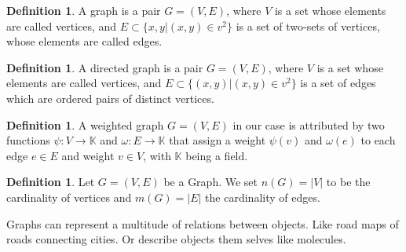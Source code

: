 \documentclass{article}
\theoremstyle{definition}
\newtheorem{definition}[theorem]{Definition}
\begin{document}
\begin{definition}
A graph is a pair $G = (V, E)$, where $V$ is a set whose elements are called vertices, and $E \subset \{ {x, y}|(x,y) \in v^{2} \}$ is a set of two-sets of vertices, whose elements are called edges.
\end{definition}

\begin{definition}
A directed graph is a pair $G = (V, E)$, where $V$ is a set whose elements are called vertices, and $E \subset \{ (x, y)|(x,y) \in v^{2} \}$ is a set of edges which are ordered pairs of distinct vertices.
\end{definition}

\begin{definition}
A weighted graph $G = (V, E)$ in our case is attributed by two functions $\psi : V \to \mathbb{K}$ and $\omega : E \to \mathbb{K}$ that assign a weight $\psi(v)$ and $\omega(e)$ to each edge $e \in E$ and weight $v \in V$, with $\mathbb{K}$ being a field.
\end{definition}

\begin{definition}
Let $G = (V, E)$ be a Graph. We set $n(G) = |V|$ to be the cardinality of vertices and $m(G) = |E|$ the cardinality of edges.
\end{definition}

Graphs can represent a multitude of relations between objects. Like road maps of roads connecting cities. Or describe objects them selves like molecules.
\end{document}

